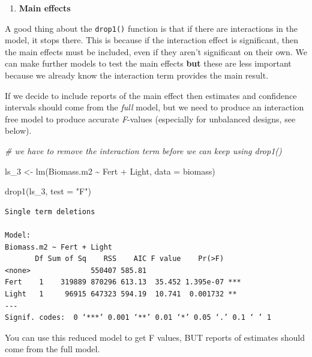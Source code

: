 \documentclass[
]{book}
\makeatletter
\newenvironment{Shaded}{\begin{snugshade}}{\end{snugshade}}
\newcommand{\AttributeTok}[1]{\textcolor[rgb]{0.77,0.63,0.00}{#1}}
\newcommand{\CommentTok}[1]{\textcolor[rgb]{0.56,0.35,0.01}{\textit{#1}}}
\newcommand{\FunctionTok}[1]{\textcolor[rgb]{0.00,0.00,0.00}{#1}}
\newcommand{\NormalTok}[1]{#1}
\newcommand{\OtherTok}[1]{\textcolor[rgb]{0.56,0.35,0.01}{#1}}
\newcommand{\SpecialCharTok}[1]{\textcolor[rgb]{0.00,0.00,0.00}{#1}}
\newcommand{\StringTok}[1]{\textcolor[rgb]{0.31,0.60,0.02}{#1}}
\providecommand{\tightlist}{%
  \setlength{\itemsep}{0pt}\setlength{\parskip}{0pt}}
\newenvironment{kframe}{%
\medskip{}
\setlength{\fboxsep}{.8em}
 \def\at@end@of@kframe{}%
 \ifinner\ifhmode%
  \def\at@end@of@kframe{\end{minipage}}%
  \begin{minipage}{\columnwidth}%
 \fi\fi%
 \def\FrameCommand##1{\hskip\@totalleftmargin \hskip-\fboxsep
 \colorbox{shadecolor}{##1}\hskip-\fboxsep
     \hskip-\linewidth \hskip-\@totalleftmargin \hskip\columnwidth}%
 \MakeFramed {\advance\hsize-\width
   \@totalleftmargin\z@ \linewidth\hsize
   \@setminipage}}%
 {\par\unskip\endMakeFramed%
 \at@end@of@kframe}
\newenvironment{block}[1]
  {
  \begin{itemize}
  \renewcommand{\labelitemi}{
    \raisebox{-.7\height}[0pt][0pt]{
      {\setkeys{Gin}{width=3em,keepaspectratio}\texttt{[image: images/\#1]}}
    }
  }
  \setlength{\fboxsep}{1em}
  \begin{kframe}
  \item
  }
  {
  \end{kframe}
  \end{itemize}
  }
\newenvironment{rmdwarning}
  {\begin{block}{warning}}
  {\end{block}}
\makeatother
\begin{document}
\begin{enumerate}
\def\labelenumi{\arabic{enumi}.}
\setcounter{enumi}{1}
\tightlist
\item
  \textbf{Main effects}
\end{enumerate}

A good thing about the \texttt{drop1()} function is that if there are interactions in the model, it stops there. This is because if the interaction effect is significant, then the main effects must be included, even if they aren't significant on their own. We can make further models to test the main effects \textbf{but} these are less important because we already know the interaction term provides the main result.

If we decide to include reports of the main effect then estimates and confidence intervals should come from the \emph{full} model, but we need to produce an interaction free model to produce accurate \emph{F}-values (especially for unbalanced designs, see below).

\begin{Shaded}
\begin{Highlighting}[]
\CommentTok{\# we have to remove the interaction term before we can keep using drop1()}

\NormalTok{ls\_3 }\OtherTok{\textless{}{-}} \FunctionTok{lm}\NormalTok{(Biomass.m2 }\SpecialCharTok{\textasciitilde{}}\NormalTok{ Fert }\SpecialCharTok{+}\NormalTok{ Light, }\AttributeTok{data =}\NormalTok{ biomass)}

\FunctionTok{drop1}\NormalTok{(ls\_3, }\AttributeTok{test =} \StringTok{"F"}\NormalTok{)}
\end{Highlighting}
\end{Shaded}

\begin{verbatim}
Single term deletions

Model:
Biomass.m2 ~ Fert + Light
       Df Sum of Sq    RSS    AIC F value    Pr(>F)    
<none>              550407 585.81                      
Fert    1    319889 870296 613.13  35.452 1.395e-07 ***
Light   1     96915 647323 594.19  10.741  0.001732 ** 
---
Signif. codes:  0 ‘***’ 0.001 ‘**’ 0.01 ‘*’ 0.05 ‘.’ 0.1 ‘ ’ 1
\end{verbatim}

\begin{rmdwarning}
You can use this reduced model to get F values, BUT reports of estimates
should come from the full model.
\end{rmdwarning}
\end{document}
